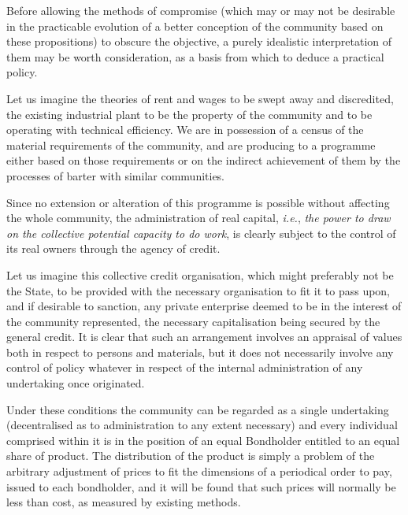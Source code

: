 \documentclass{book}
\begin{document}
Before allowing the methods of compromise (which may or may not be desirable in the practicable evolution of a better conception of the community based on these propositions) to obscure the objective, a purely idealistic interpretation of them may be worth consideration, as a basis from which to deduce a practical policy.

Let us imagine the theories of rent and wages to be swept away and discredited, the existing industrial plant to be the property of the community and to be operating with technical efficiency. We are in possession of a census of the material requirements of the community, and are producing to a programme either based on those requirements or on the indirect achievement of them by the processes of barter with similar communities.

Since no extension or alteration of this programme is possible without affecting the whole community, the administration of real capital, \emph{i.e.}, \emph{the power to draw on the collective potential capacity to do work}, is clearly subject to the control of its real owners through the agency of credit.

Let us imagine this collective credit organisation, which might preferably not be the State, to be provided with the necessary organisation to fit it to pass upon, and if desirable to sanction, any private enterprise deemed to be in the interest of the community represented, the necessary capitalisation being secured by the general credit. It is clear that such an arrangement involves an appraisal of values both in respect to persons and materials, but it does not necessarily involve any control of policy whatever in respect of the internal administration of any undertaking once originated.

Under these conditions the community can be regarded as a single undertaking (decentralised as to administration to any extent necessary) and every individual comprised within it is in the position of an equal Bondholder entitled to an equal share of product. The distribution of the product is simply a problem of the arbitrary adjustment of prices to fit the dimensions of a periodical order to pay, issued to each bondholder, and it will be found that such prices will normally be less than cost, as measured by existing methods.
\end{document}

